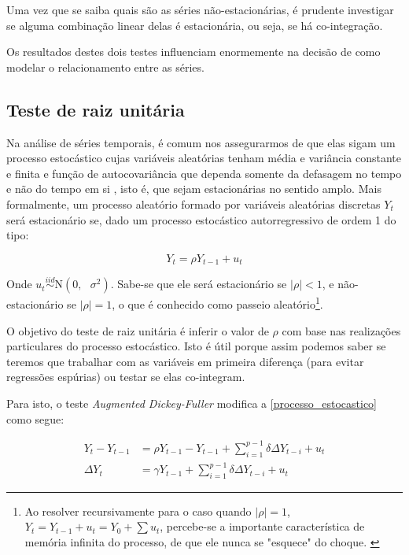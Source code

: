 \documentclass[a4paper,
               article,
               12pt,
               openany,
               oneside,
               english,
               brazil]{abntex2}
\numberwithin{equation}{section}
\begin{document}
    Uma vez que se saiba quais são as séries não-estacionárias, é prudente investigar se alguma combinação linear delas é estacionária, ou seja, se há co-integração.

    Os resultados destes dois testes influenciam enormemente na decisão de como modelar o relacionamento entre as séries. 

    \subsection{Teste de raiz unitária}

    Na análise de séries temporais, é comum nos assegurarmos de que elas sigam um processo estocástico cujas variáveis aleatórias tenham média e variância constante e finita e função de autocovariância que dependa somente da defasagem no tempo e não do tempo em si \cite[p.~734]{gujarati}, isto é, que sejam estacionárias no sentido amplo. Mais formalmente, um processo aleatório formado por variáveis aleatórias discretas $Y_t$ será estacionário se, dado um processo estocástico autorregressivo de ordem 1 do tipo:

    \begin{equation}\label{processo_estocastico} Y_t = \rho Y_{t-1} + u_t \end{equation}

    Onde $ u_t \stackrel{iid}{\sim} \text{N}(0,\text{ }\sigma^2) $. Sabe-se que ele será estacionário se $ \lvert \rho \rvert < 1 $, e não-estacionário se $ \lvert \rho \rvert = 1 $, o que é conhecido como passeio aleatório\footnote{Ao resolver recursivamente para o caso quando $ \lvert \rho \rvert = 1 $, $ Y_t = Y_{t-1} + u_t = Y_0 + \sum u_t $, percebe-se a importante característica de memória infinita do processo, de que ele nunca se "esquece" do choque. \cite[p.~736]{gujarati}}.

    O objetivo do teste de raiz unitária é inferir o valor de $ \rho $ com base nas realizações particulares do processo estocástico. Isto é útil porque assim podemos saber se teremos que trabalhar com as variáveis em primeira diferença (para evitar regressões espúrias) ou testar se elas co-integram.
    
    Para isto, o teste \textit{Augmented Dickey-Fuller} modifica a \autoref{processo_estocastico} como segue:

    \begin{align}
        \label{adf}
        Y_t - Y_{t-1} &= \rho Y_{t-1} - Y_{t-1} + \sum_{i = 1}^{p-1}\delta \Delta Y_{t-i} + u_t \nonumber \\
        \Delta Y_t &= \gamma Y_{t-1} + \sum_{i = 1}^{p-1}\delta \Delta Y_{t-i} + u_t
    \end{align}
\end{document}
